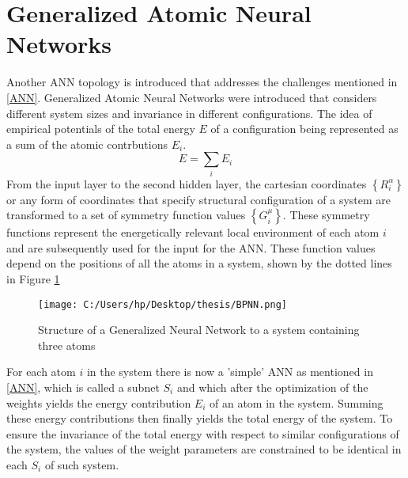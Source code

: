 \documentclass[11pt,a4paper]{report}
\begin{document}
{\section{Generalized Atomic Neural Networks}
Another ANN topology is introduced that addresses the challenges mentioned in \ref{ANN}. Generalized Atomic Neural Networks\cite{BPNN} were introduced that considers different system sizes and invariance in different configurations. The idea of empirical potentials of the total energy $E$ of a configuration being represented as a sum of the atomic contrbutions $E_i$. \begin{equation} \label{em_en}
E=\sum_{i}{E_i}
\end{equation}
From the input layer to the second hidden layer, the cartesian coordinates $\left\{R^{\alpha}_i\right\}$ or any form of coordinates that specify structural configuration of a system are transformed to a set of symmetry function values $\left\{G^{\mu}_i\right\}$. These symmetry functions represent the energetically relevant local environment of each atom $i$ and are subsequently used for the input for the ANN. These function values depend on the positions of all the atoms in a system, shown by the dotted lines in Figure \ref{BPNN}
\begin{figure}  [H] 
\centering
\texttt{[image: C:/Users/hp/Desktop/thesis/BPNN.png]}
\caption{Structure of a Generalized Neural Network to a system containing three atoms}
\label{BPNN} 
\end{figure}
For each atom $i$ in the system there is now a 'simple' ANN as mentioned in \ref{ANN}, which is called a subnet $S_i$ and which after the optimization of the weights yields the energy contribution $E_i$ of an atom in the system. Summing these energy contributions then finally yields the total energy of the system. To ensure the invariance of the total energy with respect to similar configurations of the system, the values of the weight parameters are constrained to be identical in each $S_i$ of such system. 

}
\end{document}
